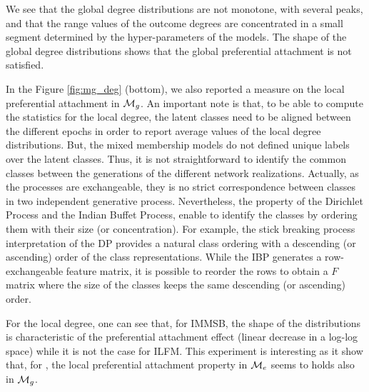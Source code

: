 We see that the global degree distributions are not monotone, with several peaks, and that the range values of the outcome degrees are concentrated in a small segment determined by the hyper-parameters of the models. The shape of the global degree distributions shows that the global preferential attachment is not satisfied. 


In the Figure \ref{fig:mg_deg} (bottom), we also reported a measure on the local preferential attachment in $\mathcal{M}_g$. An important note is that, to be able to compute the statistics for the local degree, the latent classes need to be aligned between the different epochs in order to report average values of the local degree distributions. But, the mixed membership models do not defined unique labels over the latent classes. Thus, it is not straightforward to identify the common classes between the generations of the different network realizations. Actually, as the processes are exchangeable, they is no strict correspondence between classes in two independent generative process. Nevertheless, the property of the Dirichlet Process and the Indian Buffet Process, enable to identify the classes by ordering them with their size (or concentration). For example, the stick breaking process interpretation of the DP provides a natural class ordering with a descending (or ascending) order of the class representations. While the IBP generates a row-exchangeable feature matrix, it is possible to reorder the rows to obtain a $F$ matrix where the size of the classes keeps the same descending (or ascending) order.

For the local degree, one can see that, for IMMSB, the shape of the distributions is characteristic of the preferential attachment effect (linear decrease in a log-log space) while it is not the case for ILFM. This experiment is interesting as it show that, for \imb, the local preferential attachment property in $\mathcal{M}_e$ seems to holds also in $\mathcal{M}_g$.




